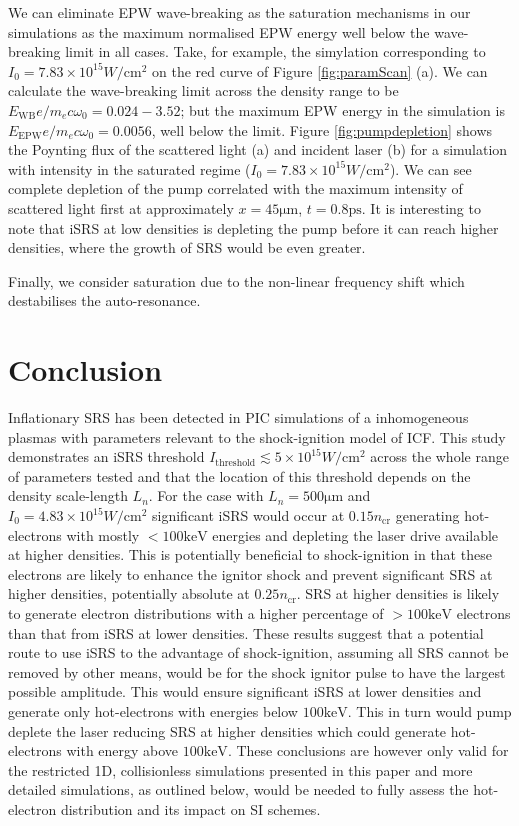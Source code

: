 We can eliminate EPW wave-breaking as the saturation mechanisms in our simulations as the maximum normalised EPW energy well below the wave-breaking limit in all cases. Take, for example, the simylation corresponding to $I_0 = 7.83\times10^{15} \si{W/\centi\metre^2}$ on the red curve of Figure \ref{fig:paramScan} (a). We can calculate the wave-breaking limit across the density range to be $E_{\text{WB}} e/m_ec\omega_0 = 0.024 - 3.52 $; but the maximum EPW energy in the simulation is $E_{\text{EPW}} e/m_ec\omega_0 = 0.0056$, well below the limit.
Figure \ref{fig:pumpdepletion} shows the Poynting flux of the scattered light (a) and incident laser (b) for a simulation with intensity in the saturated regime ($I_0 = 7.83\times10^{15} \si{W/\centi\metre^2}$). We can see complete depletion of the pump correlated with the maximum intensity of scattered light first at approximately $x=45\si{\micro\metre}$, $t=0.8\si{\pico\second}$. It is interesting to note that iSRS at low densities is depleting the pump before it can reach higher densities, where the growth of SRS would be even greater. 

Finally, we consider saturation due to the non-linear frequency shift which destabilises the auto-resonance.


\section{Conclusion}\label{sec:conclusion}
Inflationary SRS has been detected in PIC simulations of a inhomogeneous plasmas
with parameters relevant to the shock-ignition model of ICF.
This study demonstrates an iSRS threshold
 $I_\mathrm{threshold} \lesssim 5\times 10^{15} \si{W/\centi\metre^2}$ across the whole range of parameters tested
 and that the location of this threshold depends on the density scale-length $L_n$. For the case with
$L_n=500 \si{\micro\metre}$ and $I_0 =4.83\times10^{15} \si{W/\centi\metre^2}$ significant iSRS  would occur
at $0.15 n_{\mathrm{cr}}$ generating hot-electrons with mostly $< 100 \si{\kilo \electronvolt}$ energies and
depleting the laser drive available at higher densities. This is potentially beneficial to
shock-ignition in that these electrons are likely to enhance the ignitor shock and prevent significant SRS at higher densities,
potentially absolute at $0.25 n_\mathrm{cr}$. SRS at higher densities is likely to
generate electron distributions with a higher percentage of
$> 100 \si{\kilo \electronvolt}$ electrons than that from iSRS at lower densities.
These results suggest that a potential route to use iSRS to the advantage of shock-ignition,
assuming all SRS cannot be removed by other means,
would be for the shock ignitor pulse to have the largest possible amplitude. This would ensure significant iSRS at lower
densities and generate only hot-electrons with energies below $100 \si{\kilo \electronvolt}$. This in turn would pump deplete the laser
reducing SRS at higher densities which could generate hot-electrons with energy above  $100 \si{\kilo \electronvolt}$. These conclusions are however only valid for the restricted 1D, collisionless simulations
presented in this paper and more detailed simulations, as outlined below, would be needed to fully assess the hot-electron
distribution and its impact on SI schemes.

